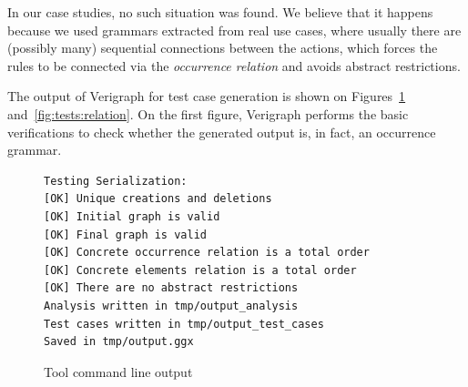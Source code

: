 In our case studies, no such situation was found. We believe that it happens because we used grammars extracted from real use cases, where usually there are (possibly many) sequential connections between the actions, which forces the rules to be connected via the \emph{occurrence relation} and avoids abstract restrictions.

The output of Verigraph for test case generation is shown on Figures~\ref{fig:tests:checklist} and~\ref{fig:tests:relation}. On the first figure, Verigraph performs the basic verifications to check whether the generated output is, in fact, an occurrence grammar.

\begin{figure}[!ht]
\caption{Tool command line output}
\begin{verbatim}
Testing Serialization:
[OK] Unique creations and deletions
[OK] Initial graph is valid
[OK] Final graph is valid
[OK] Concrete occurrence relation is a total order
[OK] Concrete elements relation is a total order
[OK] There are no abstract restrictions
Analysis written in tmp/output_analysis
Test cases written in tmp/output_test_cases
Saved in tmp/output.ggx
\end{verbatim}
  \label{fig:tests:checklist}
\end{figure}

